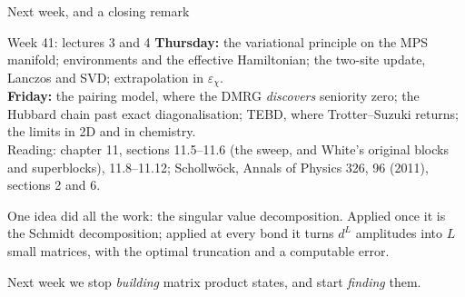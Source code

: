 \documentclass[aspectratio=169,10pt]{beamer}
\begin{document}
\begin{frame}{Next week, and a closing remark}
  \begin{exampleblock}{Week 41: lectures 3 and 4}
    \small
    \textbf{Thursday:} the variational principle on the MPS manifold; environments and the effective Hamiltonian; the two-site update, Lanczos and SVD; extrapolation in $\varepsilon_\chi$.\\
    \textbf{Friday:} the pairing model, where the DMRG \emph{discovers} seniority zero; the Hubbard chain past exact diagonalisation; TEBD, where Trotter--Suzuki returns; the limits in 2D and in chemistry.\\
    Reading: chapter 11, sections 11.5--11.6 (the sweep, and White's original blocks and superblocks), 11.8--11.12; Schollw\"ock, Annals of Physics 326, 96 (2011), sections 2 and 6.
  \end{exampleblock}
  \vspace{0.6em}
  One idea did all the work: the singular value decomposition. Applied once it is the Schmidt decomposition; applied at every bond it turns $d^L$ amplitudes into $L$ small matrices, with the optimal truncation and a computable error.
  \vspace{0.6em}

  \centering\alert{Next week we stop \emph{building} matrix product states, and start \emph{finding} them.}
\end{frame}
\end{document}
